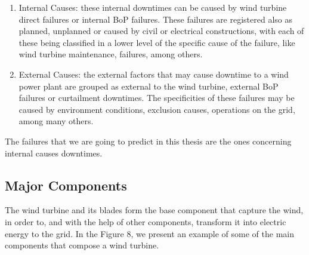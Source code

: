 
\begin{enumerate}
    \item 
Internal Causes: these internal downtimes can be caused by wind turbine direct failures or internal BoP failures. These failures are registered also as planned, unplanned or caused by civil or electrical constructions, with each of these being classified in a lower level of the specific cause of the failure, like wind turbine maintenance, failures, among others.

    \item
External Causes: the external factors that may cause downtime to a wind power plant are grouped as external to the wind turbine, external BoP failures or curtailment downtimes. The specificities of these failures may be caused by environment conditions, exclusion causes, operations on the grid, among many others.
\end{enumerate}

The failures that we are going to predict in this thesis are the ones concerning internal causes downtimes.



\subsection{Major Components} 
\label{sub:if_you_use_this_template} 

The wind turbine and its blades form the base component that capture the wind, in order to, and with the help of other components, transform it into electric energy to the grid. In the Figure 8, we present an example of some of the main components that compose a wind turbine.

